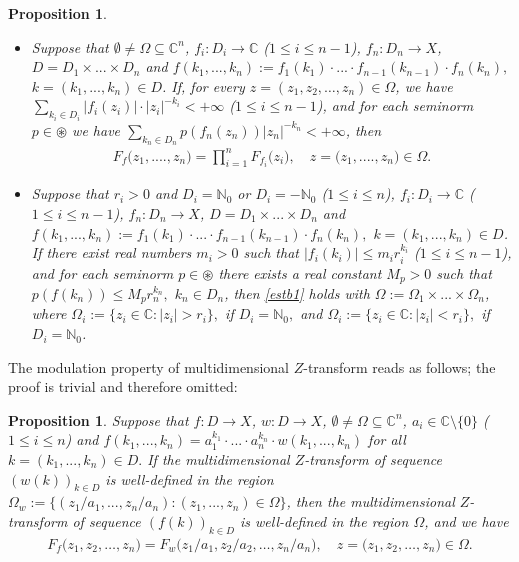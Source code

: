 \documentclass{amsart}
\newtheorem{prop}[thm]{Proposition}
\theoremstyle{definition}
\theoremstyle{remark}
\numberwithin{equation}{section}
\begin{document}
\begin{prop}\label{linear1}
\begin{itemize}
\item[(i)] Suppose that $\emptyset \neq \Omega \subseteq {\mathbb C}^{n}$, $f_{i}: D_{i} \rightarrow {\mathbb C}$ ($1\leq i\leq n-1$), $f_{n}: D_{n} \rightarrow X$, $D=D_{1}\times ... \times D_{n}$ and $f(k_{1},...,k_{n}):=f_{1}(k_{1}) \cdot ... \cdot f_{n-1}(k_{n-1})\cdot f_{n}(k_{n}),$ $k=(k_{1},...,k_{n})\in D$. If, for every $z=(z_{1},z_{2},\ldots ,z_{n})\in \Omega $, we have
$\sum_{k_{i}\in D_{i}}| f_{i}(z_{i})| \cdot |  z_{i}|^{-k_{i}}<+\infty$  ($1\leq i\leq n-1$), and
for each seminorm $p\in \circledast$ 
we have $\sum_{k_{n}\in D_{n}}p(f_{n}(z_{n}))|z_{n}|^{-k_{n}}<+\infty$, then 
\begin{align}\label{estb1}
F_{f}\bigl(z_{1},....,z_{n}\bigr)=\prod_{i=1}^{n}F_{f_{i}}\bigl(z_{i}\bigr) ,\quad z=\bigl(z_{1},....,z_{n}\bigr)\in \Omega.
\end{align}
\item[(ii)]
Suppose that $r_{i}>0$ and $D_{i}={\mathbb N}_{0}$ or $D_{i}=-{\mathbb N}_{0}$ ($1\leq i\leq n$), $f_{i}: D_{i} \rightarrow {\mathbb C}$ ($1\leq i\leq n-1$), $f_{n}: D_{n} \rightarrow X$, $D=D_{1}\times ... \times D_{n}$ and $f(k_{1},...,k_{n}):=f_{1}(k_{1}) \cdot ... \cdot f_{n-1}(k_{n-1})\cdot f_{n}(k_{n}),$ $k=(k_{1},...,k_{n})\in D$. If there exist real numbers $m_{i}>0$ such that $|f_{i}(k_{i})|\leq m_{i}r_{i}^{k_{i}}$ ($1\leq i\leq n-1$), and for each seminorm $p\in \circledast$ there exists a real constant $M_{p}>0$ such that $p(f(k_{n}))\leq M_{p}r_{n}^{k_{n}},$ $k_{n}\in D_{n}$, then \eqref{estb1} holds with $\Omega :=\Omega_{1} \times ... \times \Omega_{n}$, where $\Omega_{i}:=\{z_{i}\in {\mathbb C} : |z_{i}|>r_{i}\},$ if $D_{i}={\mathbb N}_{0},$ and $\Omega_{i}:=\{z_{i}\in {\mathbb C} : |z_{i}|<r_{i}\},$ if $D_{i}={\mathbb N}_{0}$.
\end{itemize}
\end{prop}
 
The modulation property of multidimensional $Z$-transform reads as follows; the proof is trivial and therefore omitted:
 
\begin{prop}\label{manulakis0}
Suppose that $f: D \rightarrow X$, $w: D \rightarrow X$, $\emptyset \neq \Omega \subseteq {\mathbb C}^{n}$, $a_{i}\in {\mathbb C} \setminus \{0\}$ ($1\leq i\leq n$) and $f(k_{1},...,k_{n})=a_{1}^{k_{1}}\cdot ... \cdot a_{n}^{k_{n}}\cdot w(k_{1},...,k_{n})$ for all $k=(k_{1},...,k_{n})\in D.$ If the multidimensional $Z$-transform of sequence $(w(k))_{k\in D}$ is well-defined in the region $\Omega_{w}:=\{ (z_{1}/a_{1},...,z_{n}/a_{n}) : (z_{1} ,...,z_{n} )\in \Omega \}$, then the multidimensional $Z$-transform of sequence $(f(k))_{k\in D}$ is well-defined in the region $\Omega$, and we have
\begin{align*}
F_{f}\bigl(z_{1},z_{2},\ldots ,z_{n}\bigr)= F_{w}\bigl(z_{1}/a_{1},z_{2}/a_{2},\ldots ,z_{n}/a_{n}\bigr),\quad z=\bigl(z_{1},z_{2},\ldots ,z_{n}\bigr)\in \Omega.
\end{align*}
\end{prop}
\end{document}
